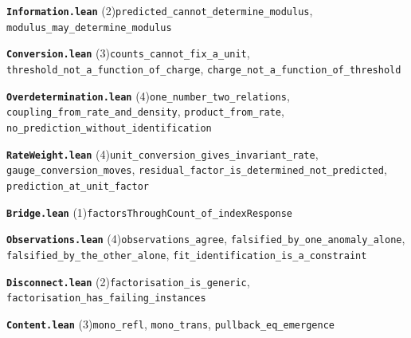\documentclass[11pt,a4paper]{article}
\theoremstyle{sudef}
\begin{document}
\noindent\textbf{\texttt{Information.lean}} (2)\quad \texttt{predicted\_\allowbreak cannot\_\allowbreak determine\_\allowbreak modulus}, \texttt{modulus\_\allowbreak may\_\allowbreak determine\_\allowbreak modulus}\par\smallskip
\noindent\textbf{\texttt{Conversion.lean}} (3)\quad \texttt{counts\_\allowbreak cannot\_\allowbreak fix\_\allowbreak a\_\allowbreak unit}, \texttt{threshold\_\allowbreak not\_\allowbreak a\_\allowbreak function\_\allowbreak of\_\allowbreak charge}, \texttt{charge\_\allowbreak not\_\allowbreak a\_\allowbreak function\_\allowbreak of\_\allowbreak threshold}\par\smallskip
\noindent\textbf{\texttt{Overdetermination.lean}} (4)\quad \texttt{one\_\allowbreak number\_\allowbreak two\_\allowbreak relations}, \texttt{coupling\_\allowbreak from\_\allowbreak rate\_\allowbreak and\_\allowbreak density}, \texttt{product\_\allowbreak from\_\allowbreak rate}, \texttt{no\_\allowbreak prediction\_\allowbreak without\_\allowbreak identification}\par\smallskip
\noindent\textbf{\texttt{RateWeight.lean}} (4)\quad \texttt{unit\_\allowbreak conversion\_\allowbreak gives\_\allowbreak invariant\_\allowbreak rate}, \texttt{gauge\_\allowbreak conversion\_\allowbreak moves}, \texttt{residual\_\allowbreak factor\_\allowbreak is\_\allowbreak determined\_\allowbreak not\_\allowbreak predicted}, \texttt{prediction\_\allowbreak at\_\allowbreak unit\_\allowbreak factor}\par\smallskip
\noindent\textbf{\texttt{Bridge.lean}} (1)\quad \texttt{factorsThroughCount\_\allowbreak of\_\allowbreak indexResponse}\par\smallskip
\noindent\textbf{\texttt{Observations.lean}} (4)\quad \texttt{observations\_\allowbreak agree}, \texttt{falsified\_\allowbreak by\_\allowbreak one\_\allowbreak anomaly\_\allowbreak alone}, \texttt{falsified\_\allowbreak by\_\allowbreak the\_\allowbreak other\_\allowbreak alone}, \texttt{fit\_\allowbreak identification\_\allowbreak is\_\allowbreak a\_\allowbreak constraint}\par\smallskip
\noindent\textbf{\texttt{Disconnect.lean}} (2)\quad \texttt{factorisation\_\allowbreak is\_\allowbreak generic}, \texttt{factorisation\_\allowbreak has\_\allowbreak failing\_\allowbreak instances}\par\smallskip
\noindent\textbf{\texttt{Content.lean}} (3)\quad \texttt{mono\_\allowbreak refl}, \texttt{mono\_\allowbreak trans}, \texttt{pullback\_\allowbreak eq\_\allowbreak emergence}\par\smallskip
\end{document}
